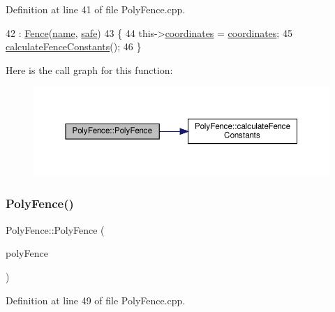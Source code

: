 Definition at line 41 of file Poly\+Fence.\+cpp.


\begin{DoxyCode}
42         : \hyperlink{class_fence_a5c2be718e885ed9ae2ca048406d126b3}{Fence}(\hyperlink{class_fence_aa405676733f25812b38ea0dd9ccd1863}{name}, \hyperlink{class_fence_ad570430040eee657c625a67d5589c4b5}{safe})
43 \{
44     this->\hyperlink{class_poly_fence_ae8e0c55e745979cab104ef80aeb4b418}{coordinates} = \hyperlink{class_poly_fence_ae8e0c55e745979cab104ef80aeb4b418}{coordinates};
45     \hyperlink{class_poly_fence_a229de6f5987bf7d312310b522db0d5a4}{calculateFenceConstants}();
46 \}
\end{DoxyCode}
Here is the call graph for this function\+:\nopagebreak
\begin{figure}[H]
\begin{center}
\leavevmode
\includegraphics[width=350pt]{d1/d22/class_poly_fence_a8468093f83237de375992d099727b93d_cgraph}
\end{center}
\end{figure}
\mbox{\label{class_poly_fence_ad95391c8cf7de0e39cb704cfe771101e}} 
\subsubsection{\texorpdfstring{Poly\+Fence()}{PolyFence()}\hspace{0.1cm}{\footnotesize\ttfamily [3/3]}}
{\footnotesize\ttfamily Poly\+Fence\+::\+Poly\+Fence (\begin{DoxyParamCaption}\item[{const \hyperlink{class_poly_fence}{Poly\+Fence} \&}]{poly\+Fence }\end{DoxyParamCaption})}



Definition at line 49 of file Poly\+Fence.\+cpp.


